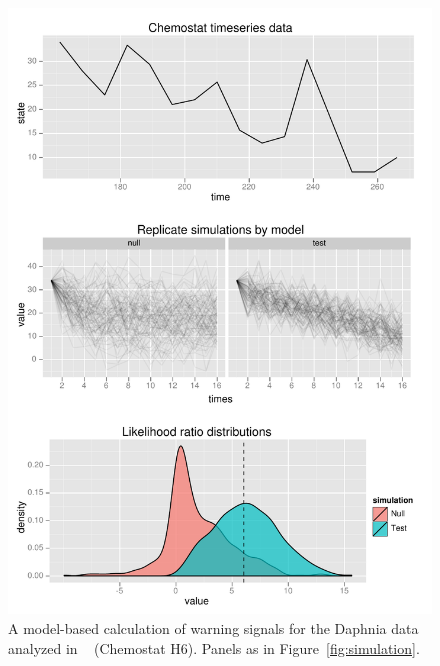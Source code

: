 \documentclass[authoryear,review,11pt]{elsarticle}
\begin{document}
 \begin{figure}
   \begin{center}
     \includegraphics[width=.85\linewidth]{figures/Chemostat_warningsignal.pdf}
     \caption{A model-based calculation of warning signals for the Daphnia data analyzed in ~\citet{Drake2010} (Chemostat H6).  
     Panels as in Figure~\ref{fig:simulation}. }
     \label{fig:chemostat}
  \end{center}
 \end{figure}
\end{document}
